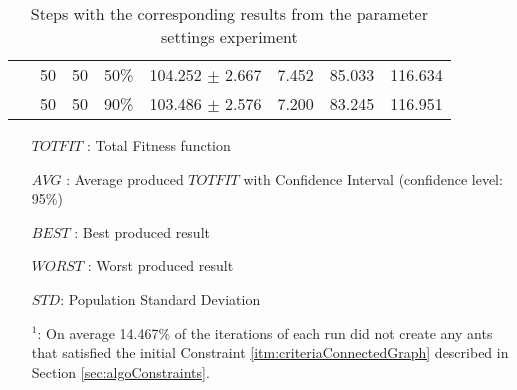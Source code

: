 \begin{table}
\begin{tabular}{|l|l|l|c||c|c|c|c|}
    ~ & 50 & 50 & 50\% & 104.252 $\pm$ 2.667 & 7.452 & 85.033 & 116.634\\
    ~ & 50 & 50 & 90\% & 103.486 $\pm$ 2.576 & 7.200 & 83.245 & 116.951\\
    \hline
    \end{tabular}
    \caption {Steps with the corresponding results from the parameter settings experiment}
    \tiny
    \begin{itemize}[noitemsep]
    \item[$TOTFIT$ :] Total Fitness function
    \item[$AVG$ :] Average produced $TOTFIT$ with Confidence Interval (confidence level: 95\%)
    \item[$BEST$ :] Best produced result
    \item[$WORST$ :] Worst produced result
    \item[$STD$:] Population Standard Deviation 
    \item[$^1$:] On average 14.467\% of the iterations of each run did not create any ants that satisfied the initial Constraint \ref{itm:criteriaConnectedGraph} described in Section \vref{sec:algoConstraints}.
    \end{itemize}
    \label{table:pm1}
\end{table}

